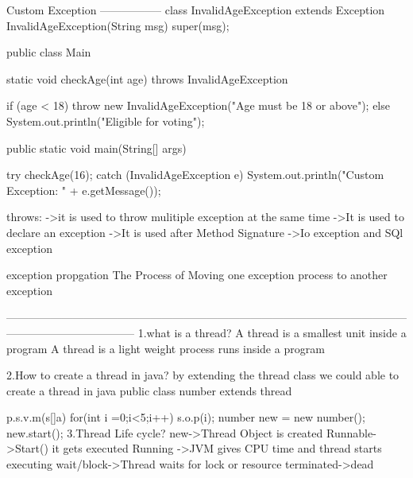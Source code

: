 {{{{{{Custom Exception
-----------------
                    class InvalidAgeException extends Exception {     
                                  InvalidAgeException(String msg) {
                                      super(msg);
                                  }
                              }

                              public class Main {
                                  static void checkAge(int age) throws InvalidAgeException {
                              
                                      if (age < 18) {
                                          throw new InvalidAgeException("Age must be 18 or above");
                                      } else {
                                          System.out.println("Eligible for voting");
                                      }
                                  }
                              
                                  public static void main(String[] args) {
                              
                                      try {
                                          checkAge(16);
                                      } catch (InvalidAgeException e) {
                                          System.out.println("Custom Exception: " + e.getMessage());
                                      }
                                  }
                              }
 throws:
           ->it is used to throw mulitiple exception at the same time
           ->It is used to declare an exception
           ->It is used after Method Signature
           ->Io exception and SQl exception




exception propgation
          The Process of Moving one exception process to another exception 

-----------------------------------------------------------------------------------------------------------------------------------------------
1.what is a thread?
A thread is a smallest unit inside a program
A thread is a light weight process runs inside a program 

2.How to create a thread in java?
by extending the thread class we could able to create a thread in java
public class number extends thread{
p.s.v.m(s[]a){
for(int i =0;i<5;i++){
s.o.p(i);}
number new = new number();
new.start();
}
3.Thread Life cycle?
new->Thread Object is created
Runnable->Start() it gets executed
Running ->JVM gives CPU time and thread starts executing
wait/block->Thread waits for lock or resource
terminated->dead

}}}}}}}
